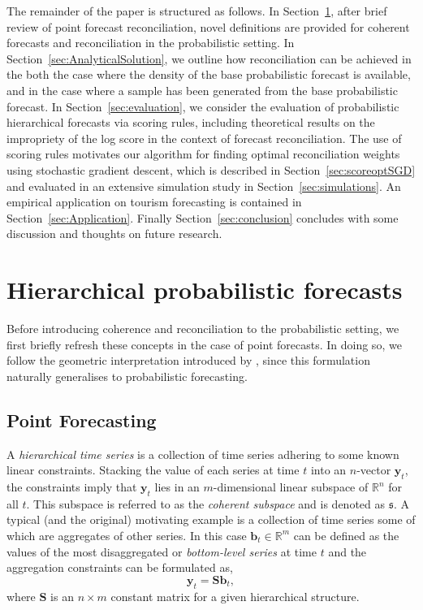 \documentclass[12pt]{article}
\theoremstyle{definition}
\begin{document}
The remainder of the paper is structured as follows. In Section~\ref{sec:ProbForecasts}, after  brief review of point forecast reconciliation, novel definitions are provided for coherent forecasts and reconciliation in the probabilistic setting. In Section~\ref{sec:AnalyticalSolution}, we outline how reconciliation can be achieved in the both the case where the density of the base probabilistic forecast is available, and in the case where a sample has been generated from the base probabilistic forecast.  In Section~\ref{sec:evaluation}, we consider the evaluation of probabilistic hierarchical forecasts via scoring rules, including theoretical results on the impropriety of the log score in the context of forecast reconciliation.  The use of scoring rules motivates our algorithm for finding optimal reconciliation weights using stochastic gradient descent, which is described in Section~\ref{sec:scoreoptSGD} and evaluated in an extensive simulation study in Section~\ref{sec:simulations}. An empirical application on tourism forecasting is contained in Section~\ref{sec:Application}. Finally Section~\ref{sec:conclusion} concludes with some discussion and thoughts on future research.

\section{Hierarchical probabilistic forecasts}\label{sec:ProbForecasts}

Before introducing coherence and reconciliation to the probabilistic setting, we first briefly refresh these concepts in the case of point forecasts.  In doing so, we follow the geometric interpretation introduced by \cite{PanEtAl2019HF}, since this formulation naturally generalises to probabilistic forecasting.


\subsection{Point Forecasting}\label{sec:PointForecasts}

A \emph{hierarchical time series} is a collection of time series adhering to some known linear constraints.  Stacking the value of each series at time $t$ into an $n$-vector ${\bm y}_t$, the constraints imply that ${\bm y}_t$ lies in an $m$-dimensional linear subspace of $\mathbb{R}^n$ for all $t$.  This subspace is referred to as the {\em coherent subspace} and is denoted as $\mathfrak{s}$.  A typical (and the original) motivating example is a collection of time series some of which are aggregates of other series. In this case $\bm{b}_t \in \mathbb{R}^m$ can be defined as the values of the most disaggregated or \emph{bottom-level series} at time $t$ and the aggregation constraints can be formulated as,
\begin{equation*}
\bm{y}_t = \bm{Sb}_t,
\end{equation*}
where $\bm{S}$ is an $n \times m$ constant matrix for a given hierarchical structure.
\end{document}
